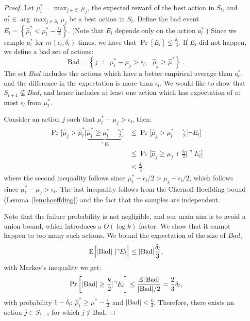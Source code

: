 \begin{proof}
Let $\mu^*_l=\max_{j\in S_l} \mu_j$, the expected reward of the best action in $S_l$, and $a^*_l\in\arg\max_{j\in S_l} \mu_j$ be a best action in $S_l$.
Define the bad event $E_{l}=\left\{\hat{\mu}^{*}_l<\mu^{*}_l-\frac{\epsilon_{1}}{2}\right\}$. (Note that $E_l$ depends only on the action $a^*_l$.) Since we sample $a^*_l$ for $m(\epsilon_l,\delta_l)$ times, we have that $\Pr\left[E_{l}\right]\le\frac{\delta_{l}}{3}$. If $E_{l}$ did not happen, we define a bad set of actions:
\[
\text{Bad}=\left\{ j\text{ }:\text{ }\mu^{*}_l-\mu_{j}>\epsilon_{l},\text{ }\hat{\mu}_{j}\ge\hat{\mu}^{*}\right\}\;.
\]
The set $Bad$ includes the actions which have a better empirical average than $a_l^*$, and the difference in the expectation is more than $\epsilon_l$. We would like to show that $S_{l+1}\not\subseteq Bad$, and hence includes at least one action which has expectation of at most $\epsilon_l$ from $\mu^*_l$.


Consider an action $j$ such that $\mu^*_l-\mu_j > \epsilon_l$, then:
\begin{align*}
\Pr\Big[\hat{\mu}_{j}>
\hat{\mu}^{*}_l|\underbrace{\hat{\mu}^{*}_l\ge\mu^{*}_l-\frac{\epsilon_{l}}{2}}_{\urcorner
E_{l}}\Big] & \le \Pr\Big[\hat{\mu}_{j}> \mu^{*}_l-\frac{\epsilon_{l}}{2}| \neg E_l\Big]\\
&\leq
\Pr\Big[\hat{\mu}_{j}\ge\mu_{j}+\frac{\epsilon_{l}}{2}|\urcorner E_{l}\Big]\\
&\le  \frac{\delta_{l}}{3},
\end{align*}
where the second inequality follows since $\mu^*_l-\epsilon_l/2 > \mu_j+\epsilon_l/2$, which follows since $\mu^*_l-\mu_j>\epsilon_l$. The last inequality follows from the Chernoff-Hoeffding bound (Lemma~\ref{lem:hoeffding}) and the fact that the samples are independent.



Note that the failure probability is not negligible, and our main aim is to avoid a union bound, which  introduces a $O(\log k)$ factor. We  show that it cannot happen to too many such actions. We  bound the expectation of the size of $Bad$,
\[
\mathbb{E}\Big[|\text{Bad}|\;|\urcorner E_{l}\Big]\le |\text{Bad}|\frac{\delta_{l}}{3},
\]
 with Markov's inequality we get:
\[
\Pr\left[\left|\text{Bad}\right|\ge\frac{k}{2}|\urcorner E_{l}\right]
 \le  \frac{\mathbb{E}\left|\text{Bad}\right|}{|\text{Bad}|/2}
  =  \frac{2}{3}\delta_{l},
\]
 with probability $1-\delta_{l}$: $\hat{\mu}^{*}_l\ge\mu^{*}-\frac{\epsilon_{l}}{2}$ and $\left|\text{Bad}\right|<\frac{k}{2}$. Therefore, there exists an action $j\in S_{l+1}$ for which $j \notin\text{Bad}$.
\end{proof}

